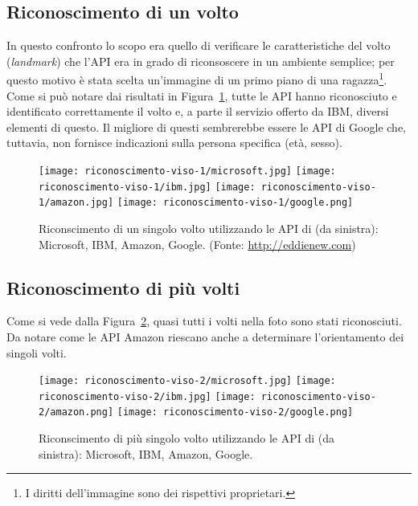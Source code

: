 \subsection{Riconoscimento di un volto}\label{subsec:riconscimento-singolo-volto}
In questo confronto lo scopo era quello di verificare le caratteristiche del volto (\textit{landmark}) che l'API era in grado di riconsoscere in un ambiente semplice;
per questo motivo è stata scelta un'immagine di un primo piano di una ragazza\footnote{I diritti dell'immagine sono dei rispettivi proprietari.}.
Come si può notare dai risultati in Figura~\ref{fig:riconscimento-singolo-volto}, tutte le API hanno riconosciuto e identificato correttamente il volto e, a parte
il servizio offerto da IBM, diversi elementi di questo.
Il migliore di questi sembrerebbe essere le API di Google che, tuttavia, non fornisce indicazioni sulla persona specifica (età, sesso).
\begin{figure}[!h]
\begin{center}
	\texttt{[image: riconoscimento-viso-1/microsoft.jpg]}
	\texttt{[image: riconoscimento-viso-1/ibm.jpg]}
	\texttt{[image: riconoscimento-viso-1/amazon.jpg]}
	\texttt{[image: riconoscimento-viso-1/google.png]}
{\scriptsize \caption{Riconscimento di un singolo volto utilizzando le API di (da sinistra): Microsoft, IBM, Amazon, Google. (Fonte: \url{http://eddienew.com})}
\label{fig:riconscimento-singolo-volto}}
\end{center}
\end{figure}
%
\subsection{Riconoscimento di più volti}\label{subsec:riconscimento-volti-multipli}
Come si vede dalla Figura~\ref{fig:riconscimento-volti-multipli}, quasi tutti i volti nella foto sono stati riconosciuti.
Da notare come le API Amazon riescano anche a determinare l'orientamento dei singoli volti. 
\begin{figure}[!h]
\begin{center}
	\texttt{[image: riconoscimento-viso-2/microsoft.jpg]}
	\texttt{[image: riconoscimento-viso-2/ibm.jpg]}
	\texttt{[image: riconoscimento-viso-2/amazon.png]}
	\texttt{[image: riconoscimento-viso-2/google.png]}
{\scriptsize \caption{Riconscimento di più singolo volto utilizzando le API di (da sinistra): Microsoft, IBM, Amazon, Google.}
\label{fig:riconscimento-volti-multipli}}
\end{center}
\end{figure}
%
